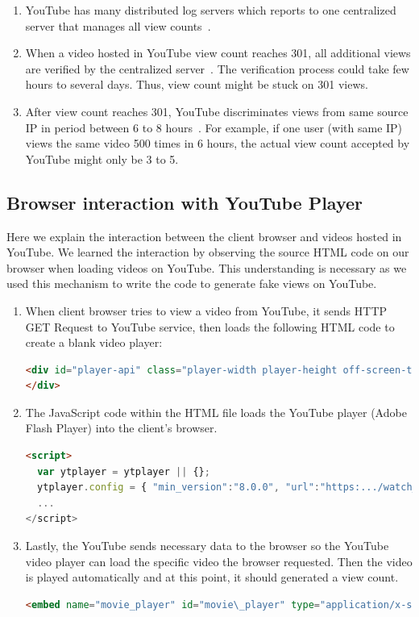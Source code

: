 \documentclass[conference]{IEEEtran}
\begin{document}
\begin{enumerate}
    \item YouTube has many distributed log servers which reports to one centralized server that manages all view counts~\cite{c11}.
    \item When a video hosted in YouTube view count reaches 301, all additional views are verified by the centralized server~\cite{c11}. The verification process could take few hours to several days. Thus, view count might be stuck on 301 views.
    \item After view count reaches 301, YouTube discriminates views from same source IP in period between 6 to 8 hours~\cite{c11}. For example, if one user (with same IP) views the same video 500 times in 6 hours, the actual view count accepted by YouTube might only be 3 to 5.
\end{enumerate}

\subsection{Browser interaction with YouTube Player}

Here we explain the interaction between the client browser and videos hosted in YouTube. We learned the interaction by observing the source HTML code on our browser when loading videos on YouTube. This understanding is necessary as we used this mechanism to write the code to generate fake views on YouTube.

\begin{enumerate}
  \item When client browser tries to view a video from YouTube, it sends HTTP GET Request to YouTube service, then loads the following HTML code to create a blank video player:
  \begin{lstlisting}[frame=single, language=html]
<div id="player-api" class="player-width player-height off-screen-target player-api" tabIndex="-1">
</div>
  \end{lstlisting}
  \item The JavaScript code within the HTML file loads the YouTube player (Adobe Flash Player) into the client’s browser.
  \begin{lstlisting}[frame=single, language=html]
<script>
  var ytplayer = ytplayer || {};
  ytplayer.config = { "min_version":"8.0.0", "url":"https:.../watch_as3.swf"
  ...
</script>
  \end{lstlisting}
  \item Lastly, the YouTube sends necessary data to the browser so the YouTube video player can load the specific video the browser requested. Then the video is played automatically and at this point, it should generated a view count.
  \begin{lstlisting}[frame=single, language=html]
<embed name="movie_player" id="movie\_player" type="application/x-shockwave-flash" src="https:.../watch\_as3.swf" allowscriptaccess="always" bgcolor="#000000" allowfullscreen="true" ...>
  \end{lstlisting}
\end{enumerate}
\end{document}
